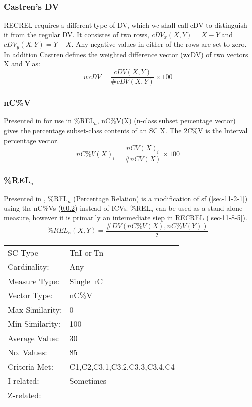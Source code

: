 \documentclass{article}
\begin{document}
\subsubsection{Castren's DV}
\label{sec-11-8-1}

RECREL requires a different type of DV, which we shall call cDV to
distinguish it from the regular DV. It consistes of two rows,
$cDV_{x}(X,Y)=X-Y$ and $cDV_{y}(X,Y)=Y-X$. Any negative values in
either of the rows are set to zero.
In addition Castren defines the weighted difference vector (wcDV) of
two vectors X and Y as: 
$$wcDV=\frac{cDV(X,Y)}{\#cDV(X,Y)}\times 100$$ 
\subsubsection{nC\%V}
\label{sec-11-8-2}

Presented in \citet{Castren1994} for use in \%REL$_{n}$, nC\%V(X) (n-class
subset percentage vector) gives the percentage subset-class contents
of an SC X. The 2C\%V is the Interval percentage vector.
$$ nC\%V(X)_{i}
= \frac{nCV(X)_{i}}{\#nCV(X)}\times 100 $$
\subsubsection{\%REL$_{n}$}
\label{sec-11-8-3}

Presented in \citet{Castren1994}, \%REL$_{n}$ (Percentage Relation) is a
modification of sf (\ref{sec-11-2-1}) using the nC\%Vs (\ref{sec-11-8-2}) instead of
ICVs. \%REL$_{n}$ can be used as a stand-alone measure, however it is
primarily an intermediate step in RECREL (\ref{sec-11-8-5}).
$$\%REL_n(X,Y)=\frac{\#DV(nC\%V(X),nC\%V(Y))}{2} $$

\begin{center}
\begin{tabular}{ll}
 SC Type          &  TnI or Tn                     \\
 Cardinality:     &  Any                           \\
 Measure Type:    &  Single nC                     \\
 Vector Type:     &  nC\%V                         \\
 Max Similarity:  &  0                             \\
 Min Similarity:  &  100                           \\
 Average Value:   &  30                            \\
 No. Values:      &  85                            \\
 Criteria Met:    &  C1,C2,C3.1,C3.2,C3.3,C3.4,C4  \\
 I-related:       &  Sometimes                     \\
 Z-related:       &                                \\
\end{tabular}
\end{center}
\end{document}

